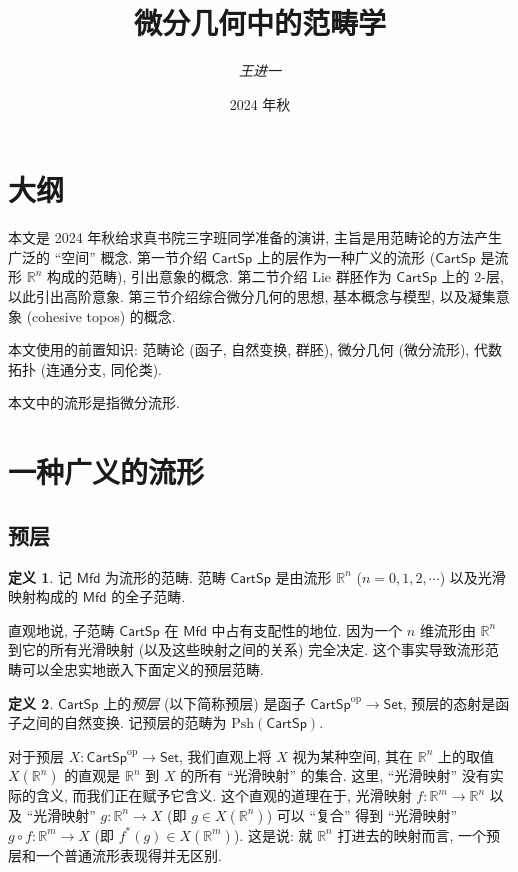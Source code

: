 \documentclass{article}
\theoremstyle{definition}
\newtheorem{definition}{定义}[section]
\newcommand{\CartSp}{\mathsf{CartSp}}
\newcommand{\Set}{\mathsf{Set}}
\newcommand{\Mfd}{\mathsf{Mfd}}
\newcommand{\op}{\mathrm{op}}
\newcommand{\Psh}{\mathrm{Psh}}
\begin{document}
	
	\title{微分几何中的范畴学}
	\author{\emph{王进一}}
	\date{2024 年秋}
	\maketitle
	
	
	\section*{大纲}
	本文是 2024 年秋给求真书院三字班同学准备的演讲, 主旨是用范畴论的方法产生广泛的 ``空间'' 概念.
	第一节介绍 $\mathsf{CartSp}$ 上的层作为一种广义的流形 ($\mathsf{CartSp}$ 是流形 $\mathbb R^n$ 构成的范畴), 引出意象的概念.
	第二节介绍 Lie 群胚作为 $\mathsf{CartSp}$ 上的 $2$-层, 以此引出高阶意象.
	第三节介绍综合微分几何的思想, 基本概念与模型, 以及凝集意象 (cohesive topos) 的概念.
	
	本文使用的前置知识: 范畴论 (函子, 自然变换, 群胚), 微分几何 (微分流形), 代数拓扑 (连通分支, 同伦类).
	
	本文中的流形是指微分流形.
	
	\section{一种广义的流形}
	
	\subsection{预层}
	
	\begin{definition}
		记 $\Mfd$ 为流形的范畴.
		范畴 $\CartSp$ 是由流形 $\mathbb{R}^n$ ($n=0,1,2,\cdots$) 以及光滑映射构成的 $\Mfd$ 的全子范畴.
	\end{definition}
	
	直观地说, 子范畴 $\CartSp$ 在 $\Mfd$ 中占有支配性的地位. 因为一个 $n$ 维流形由 $\mathbb{R}^n$ 到它的所有光滑映射 (以及这些映射之间的关系) 完全决定. 这个事实导致流形范畴可以全忠实地嵌入下面定义的预层范畴.
	
	\begin{definition}
		$\CartSp$ 上的\emph{预层} (以下简称预层) 是函子 $\CartSp^\op\to\Set$, 预层的态射是函子之间的自然变换.
		记预层的范畴为 $\Psh(\CartSp)$.
	\end{definition}
	
	对于预层 $X\colon \CartSp^\op\to\Set$, 我们直观上将 $X$ 视为某种空间, 其在 $\mathbb{R}^n$ 上的取值 $X(\mathbb{R}^n)$ 的直观是 $\mathbb{R}^n$ 到 $X$ 的所有 ``光滑映射'' 的集合. 这里, ``光滑映射'' 没有实际的含义, 而我们正在赋予它含义. 这个直观的道理在于, 光滑映射 $f\colon \mathbb{R}^m\to\mathbb{R}^n$ 以及 ``光滑映射'' $g\colon \mathbb{R}^n\to X$ (即 $g\in X(\mathbb{R}^n)$) 可以 ``复合'' 得到 ``光滑映射'' $g\circ f\colon \mathbb{R}^m\to X$ (即 $f^*(g)\in X(\mathbb{R}^m)$). 这是说: 就 $\mathbb{R}^n$ 打进去的映射而言, 一个预层和一个普通流形表现得并无区别.
	
\end{document}
